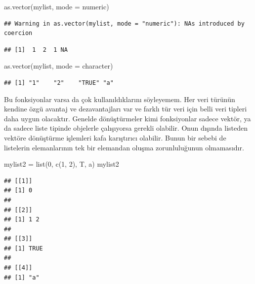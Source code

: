 \documentclass[
]{book}
\newenvironment{Shaded}{\begin{snugshade}}{\end{snugshade}}
\newcommand{\AttributeTok}[1]{\textcolor[rgb]{0.77,0.63,0.00}{#1}}
\newcommand{\DecValTok}[1]{\textcolor[rgb]{0.00,0.00,0.81}{#1}}
\newcommand{\FunctionTok}[1]{\textcolor[rgb]{0.00,0.00,0.00}{#1}}
\newcommand{\NormalTok}[1]{#1}
\newcommand{\OtherTok}[1]{\textcolor[rgb]{0.56,0.35,0.01}{#1}}
\newcommand{\StringTok}[1]{\textcolor[rgb]{0.31,0.60,0.02}{#1}}
\begin{document}
\begin{Shaded}
\begin{Highlighting}[]
\FunctionTok{as.vector}\NormalTok{(mylist, }\AttributeTok{mode =} \StringTok{\textquotesingle{}numeric\textquotesingle{}}\NormalTok{)}
\end{Highlighting}
\end{Shaded}

\begin{verbatim}
## Warning in as.vector(mylist, mode = "numeric"): NAs introduced by coercion
\end{verbatim}

\begin{verbatim}
## [1]  1  2  1 NA
\end{verbatim}

\begin{Shaded}
\begin{Highlighting}[]
\FunctionTok{as.vector}\NormalTok{(mylist, }\AttributeTok{mode =} \StringTok{\textquotesingle{}character\textquotesingle{}}\NormalTok{)}
\end{Highlighting}
\end{Shaded}

\begin{verbatim}
## [1] "1"    "2"    "TRUE" "a"
\end{verbatim}

Bu fonksiyonlar varsa da çok kullanıldıklarını söyleyemem. Her veri türünün kendine özgü avantaj ve dezavantajları var ve farklı tür veri için belli veri tipleri daha uygun olacaktır. Genelde dönüştürmeler kimi fonksiyonlar sadece vektör, ya da sadece liste tipinde objelerle çalışıyorsa gerekli olabilir. Onun dışında listeden vektöre dönüştürme işlemleri kafa karıştırıcı olabilir. Bunun bir sebebi de listelerin elemanlarının tek bir elemandan oluşma zorunluluğunun olmamasıdır.

\begin{Shaded}
\begin{Highlighting}[]
\NormalTok{mylist2 }\OtherTok{=} \FunctionTok{list}\NormalTok{(}\DecValTok{0}\NormalTok{, }\FunctionTok{c}\NormalTok{(}\DecValTok{1}\NormalTok{, }\DecValTok{2}\NormalTok{), T, }\StringTok{\textquotesingle{}a\textquotesingle{}}\NormalTok{)}
\NormalTok{mylist2}
\end{Highlighting}
\end{Shaded}

\begin{verbatim}
## [[1]]
## [1] 0
## 
## [[2]]
## [1] 1 2
## 
## [[3]]
## [1] TRUE
## 
## [[4]]
## [1] "a"
\end{verbatim}
\end{document}
